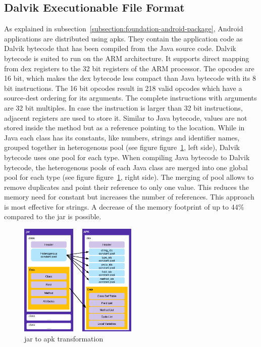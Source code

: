 \subsection{Dalvik Executionable File Format} \label{subsection:android-dex}
As explained in subsection~\ref{subsection:foundation-android-package}, Android applications are distributed using \gls{apk}s.
They contain the application code as Dalvik bytecode that has been compiled from the Java source code.
\newline
Dalvik bytecode is suited to run on the ARM architecture.
It supports direct mapping from dex registers to the 32 bit registers of the ARM processor.
The opcodes are 16 bit, which makes the dex bytecode less compact than Java bytecode with its 8 bit instructions.
The 16 bit opcodes result in 218 valid opcodes which have a source-dest ordering for its arguments.
The complete instructions with arguments are 32 bit multiples.
In case the instruction is larger than 32 bit instructions, adjacent registers are used to store it. \cite{androidDalvik}
\newline
Similar to Java bytecode, values are not stored inside the method but as a reference pointing to the location.
While in Java each class has its constants, like numbers, strings and identifier names, grouped together in heterogenous pool (see figure figure~\ref{fig:java}, left side), Dalvik bytecode uses one pool for each type.
When compiling Java bytecode to Dalvik bytecode, the heterogenous pools of each Java class are merged into one global pool for each type (see figure figure~\ref{fig:java}, right side).
The merging of pool allows to remove duplicates and point their reference to only one value.
This reduces the memory need for constant but increases the number of references.
This approach is most effective for strings.
A decrease of the memory footprint of up to 44\% compared to the \gls{jar} is possible.
\newline
\begin{figure}[h]
    \centering
    \includegraphics[width=0.5\textwidth]{data/java.png}
    \caption{\gls{jar} to \gls{apk} transformation \cite{googleDalvik}}
    \label{fig:java}
\end{figure}

